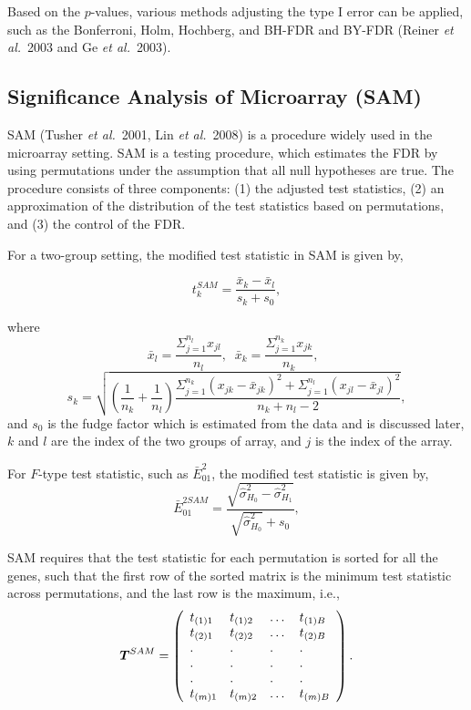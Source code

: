 Based on the $p$-values, various methods adjusting the type I error
can be applied, such as the Bonferroni, Holm, Hochberg, and BH-FDR
and BY-FDR (Reiner \textit{et al.}\ 2003 and Ge \textit{et al.}\
2003).

\subsection{Significance Analysis of Microarray (SAM)}

SAM (Tusher \textit{et al.}\ 2001, Lin \textit{et al.}\ 2008) is a procedure widely used in the
microarray setting. SAM is a testing procedure, which estimates the
FDR by using permutations under the assumption that all null
hypotheses are true. The procedure consists of three components: (1)
the adjusted test statistics, (2) an approximation of the
distribution of the test statistics based on permutations, and (3)
the control of the FDR.

For a two-group setting, the modified test statistic in SAM is given
by,

\begin{equation}
t_{k}^{SAM}= \frac{\bar{x}_{k}-\bar{x}_{l}} {s_{k}+s_{0}},
\label{ttestSAM}
\end{equation}

where \[ \bar{x}_{l}=\frac{\Sigma_{j=1}^{n_{l}} x_{jl}}{n_{l}},\;\;
\bar{x}_{k}=\frac{\Sigma_{j=1}^{n_{k}} x_{jk}}{n_{k}},\;\;\]
\[s_{k}=\sqrt{\left (\frac{1}{n_{k}}+\frac{1}{n_{l}} \right )
{\frac{\Sigma_{j=1}^{n_{k}}
   (x_{jk}-\bar{x}_{jk})^2+\Sigma_{j=1}^{n_{l}}
   (x_{jl}-\bar{x}_{jl})^2}{n_{k}+n_{l}-2}}},
   \]
and $s_0$ is the fudge factor which is estimated from the data and
is discussed later, $k$ and $l$ are the index of the two groups of
array, and $j$ is the index of the array.

For $F$-type test statistic, such as $\bar{E}_{01}^2$, the modified test
statistic is given by, 
\begin{equation}
\bar{E}_{01}^{2SAM}= \frac{\sqrt{\hat{\sigma}^2_{H_0}-\hat{\sigma}^2_{H_1}}} {\sqrt{\hat{\sigma}^2_{H_0}}+s_{0}},
\label{ttestSAM}
\end{equation}






SAM requires that the test statistic for each permutation is sorted
for all the genes, such that the first row of the sorted matrix is
the minimum test statistic across permutations, and the last row is
the maximum, i.e.,
\[\mbox{\boldmath $T$}^{SAM}= \left (
\begin{array}{llll}
t_{(1)1} & t_{(1)2} & \dots & t_{(1)B}\\
t_{(2)1} & t_{(2)2} & \dots & t_{(2)B}\\
.    & .    &.      & .     \\
.    & .    &.      & .     \\
.    & .    &.      & .     \\
t_{(m)1} & t_{(m)2} & \dots & t_{(m)B}\\
\end{array}
\right ).
\]


